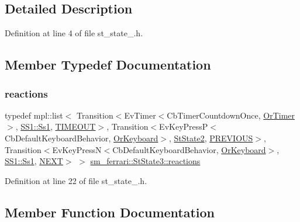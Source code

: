 \subsection{Detailed Description}


Definition at line 4 of file st\+\_\+state\+\_.\+h.



\subsection{Member Typedef Documentation}
\mbox{\label{structsm__ferrari_1_1StState3_a0c20c276c250c63a6a130be48c457c10}} 
\subsubsection{\texorpdfstring{reactions}{reactions}}
{\footnotesize\ttfamily typedef mpl\+::list$<$ Transition$<$Ev\+Timer$<$Cb\+Timer\+Countdown\+Once, \hyperlink{classsm__ferrari_1_1OrTimer}{Or\+Timer}$>$, \hyperlink{structsm__ferrari_1_1SS1_1_1Ss1}{S\+S1\+::\+Ss1}, \hyperlink{structsm__ferrari_1_1StState3_1_1TIMEOUT}{T\+I\+M\+E\+O\+UT}$>$, Transition$<$Ev\+Key\+PressP$<$Cb\+Default\+Keyboard\+Behavior, \hyperlink{classsm__ferrari_1_1OrKeyboard}{Or\+Keyboard}$>$, \hyperlink{structsm__ferrari_1_1StState2}{St\+State2}, \hyperlink{structsm__ferrari_1_1StState3_1_1PREVIOUS}{P\+R\+E\+V\+I\+O\+US}$>$, Transition$<$Ev\+Key\+PressN$<$Cb\+Default\+Keyboard\+Behavior, \hyperlink{classsm__ferrari_1_1OrKeyboard}{Or\+Keyboard}$>$, \hyperlink{structsm__ferrari_1_1SS1_1_1Ss1}{S\+S1\+::\+Ss1}, \hyperlink{structsm__ferrari_1_1StState3_1_1NEXT}{N\+E\+XT}$>$ $>$ \hyperlink{structsm__ferrari_1_1StState3_a0c20c276c250c63a6a130be48c457c10}{sm\+\_\+ferrari\+::\+St\+State3\+::reactions}}



Definition at line 22 of file st\+\_\+state\+\_.\+h.



\subsection{Member Function Documentation}
\mbox{\label{structsm__ferrari_1_1StState3_a1eb6cb90f31a755933a6f90c3b93da02}} 
